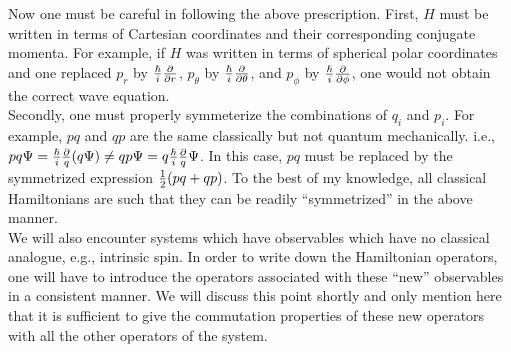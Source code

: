  Now one must be careful in following the above prescription. First, $H$ must be written in terms of Cartesian coordinates and their corresponding conjugate
 momenta. For example, if $H$ was written in terms of spherical polar coordinates and one replaced $p_r$ by ${\hbar\over i}{\partial \over \partial r}$, $p_\theta$ by 
 ${\hbar\over i}{\partial \over \partial\theta}$, and $p_\phi$ by ${\hbar\over i}{\partial\over \partial \phi}$, one would not obtain the correct wave equation.\\
 
 Secondly, one must properly symmeterize the combinations of $q_i$ and $p_i$. For example, $pq$ and $qp$ are the same classically but not quantum mechanically.
 i.e., $pq\Psi = {\hbar\over i} {\partial\over q} (q\Psi) \ne qp \Psi = q {\hbar\over i} {\partial\over q} \Psi$. In this case, $pq$ must be replaced by the symmetrized expression
 ${1\over2}(pq + qp)$. To the best of my knowledge, all classical Hamiltonians are such that they can be readily ``symmetrized'' in the above manner. \\
 
 We will also encounter systems which have observables which have no classical analogue, e.g., intrinsic spin. In order to write down
 the Hamiltonian operators, one will have to introduce the operators associated with these ``new'' observables in a consistent manner. We will discuss
 this point shortly and only mention here that it is sufficient to give the commutation properties of these new operators with all the other operators
 of the system.\\

